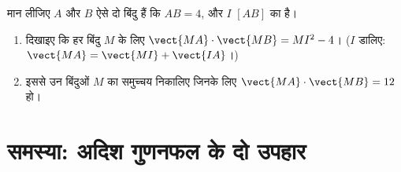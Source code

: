 \begin{exercise}[$\star\star\star$]\label{exo:g11:scal:11}
मान लीजिए $A$ और $B$ ऐसे दो बिंदु हैं कि $AB = 4$, और $I$ $[AB]$ का
 है।
\begin{enumerate}
  \item दिखाइए कि हर बिंदु $M$ के लिए $\vect{MA}\cdot\vect{MB} = MI^2 - 4$। ($I$ डालिए: $\vect{MA} = \vect{MI} + \vect{IA}$।)
  \item इससे उन बिंदुओं $M$ का समुच्चय निकालिए जिनके लिए $\vect{MA}\cdot\vect{MB} = 12$ हो।
\end{enumerate}
\end{exercise}

\section{समस्या: अदिश गुणनफल के दो उपहार}

